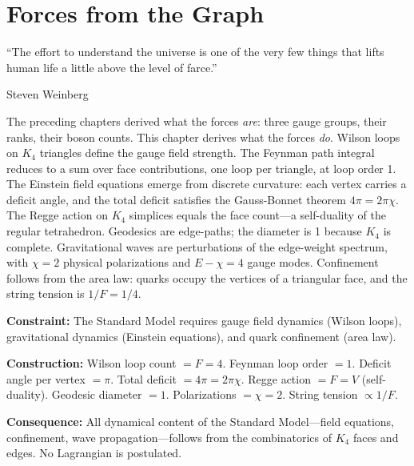 \documentclass[11pt,a4paper]{book}
\begin{document}
\chapter{Forces from the Graph}
\label{ch:forces-from-graph}

\epigraph{``The effort to understand the universe is one of the very few things that lifts human life a little above the level of farce.''}{Steven Weinberg}

The preceding chapters derived what the forces \emph{are}: three gauge groups, their ranks, their boson counts. This chapter derives what the forces \emph{do}. Wilson loops on $K_4$ triangles define the gauge field strength. The Feynman path integral reduces to a sum over face contributions, one loop per triangle, at loop order 1. The Einstein field equations emerge from discrete curvature: each vertex carries a deficit angle, and the total deficit satisfies the Gauss-Bonnet theorem $4\pi = 2\pi\chi$. The Regge action on $K_4$ simplices equals the face count---a self-duality of the regular tetrahedron. Geodesics are edge-paths; the diameter is 1 because $K_4$ is complete. Gravitational waves are perturbations of the edge-weight spectrum, with $\chi = 2$ physical polarizations and $E - \chi = 4$ gauge modes. Confinement follows from the area law: quarks occupy the vertices of a triangular face, and the string tension is $1/F = 1/4$.

\textbf{Constraint:} The Standard Model requires gauge field dynamics (Wilson loops), gravitational dynamics (Einstein equations), and quark confinement (area law).

\textbf{Construction:} Wilson loop count $= F = 4$. Feynman loop order $= 1$. Deficit angle per vertex $= \pi$. Total deficit $= 4\pi = 2\pi\chi$. Regge action $= F = V$ (self-duality). Geodesic diameter $= 1$. Polarizations $= \chi = 2$. String tension $\propto 1/F$.

\textbf{Consequence:} All dynamical content of the Standard Model---field equations, confinement, wave propagation---follows from the combinatorics of $K_4$ faces and edges. No Lagrangian is postulated.
\end{document}
